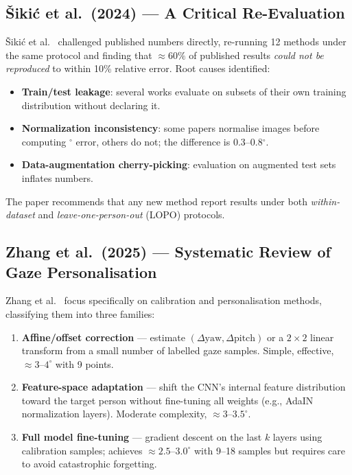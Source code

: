 \documentclass[11pt,a4paper]{article}
\begin{document}
\subsection{\v{S}iki\'{c} et al.\ (2024) --- A Critical Re-Evaluation}

\v{S}iki\'{c} et al.~\cite{sikic2024reevaluation} challenged published numbers directly,
re-running 12 methods under the same protocol and finding that $\approx60\%$ of published results
\emph{could not be reproduced} to within 10\% relative error.
Root causes identified:
\begin{itemize}
  \item \textbf{Train/test leakage}: several works evaluate on subsets of their own training
        distribution without declaring it.
  \item \textbf{Normalization inconsistency}: some papers normalise images before computing
        $^\circ$ error, others do not; the difference is 0.3--0.8$^\circ$.
  \item \textbf{Data-augmentation cherry-picking}: evaluation on augmented test sets inflates numbers.
\end{itemize}
The paper recommends that any new method report results under both \emph{within-dataset} and
\emph{leave-one-person-out} (LOPO) protocols.

\subsection{Zhang et al.\ (2025) --- Systematic Review of Gaze Personalisation}

Zhang et al.~\cite{zhang2025systematic} focus specifically on calibration and personalisation methods,
classifying them into three families:
\begin{enumerate}
  \item \textbf{Affine/offset correction} --- estimate $(\Delta\text{yaw}, \Delta\text{pitch})$ or a $2\times2$
        linear transform from a small number of labelled gaze samples.
        Simple, effective, $\approx3$--$4^\circ$ with 9 points.
  \item \textbf{Feature-space adaptation} --- shift the CNN's internal feature distribution toward
        the target person without fine-tuning all weights (e.g., AdaIN normalization layers).
        Moderate complexity, $\approx3$--$3.5^\circ$.
  \item \textbf{Full model fine-tuning} --- gradient descent on the last $k$ layers using
        calibration samples; achieves $\approx2.5$--$3.0^\circ$ with 9--18 samples but requires
        care to avoid catastrophic forgetting.
\end{enumerate}
\end{document}
